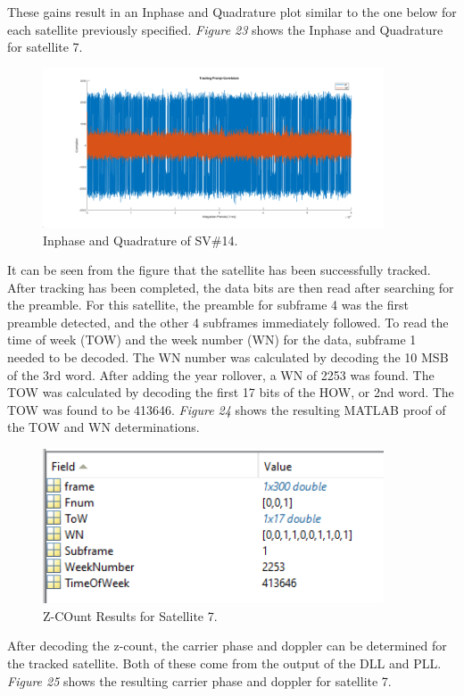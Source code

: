 \documentclass[11pt]{article}
\begin{document}
These gains result in an Inphase and Quadrature plot similar to the one below for each satellite 
previously specified. \emph{Figure 23} shows the Inphase and Quadrature for satellite 7.
    \begin{figure}[H]
        \centering
        \includegraphics[width=0.9\textwidth]{Lab_4_IQ.png}
        \caption{Inphase and Quadrature of SV\#14.}
    \end{figure}
It can be seen from the figure that the satellite has been successfully tracked. After tracking has been completed, the data bits are then read after searching for the preamble. For this satellite, the preamble for subframe 4 was the first preamble detected, and the other 4 subframes immediately followed. To read the time of week (TOW) and the week number (WN) for the data, subframe 1 needed to be decoded. The WN number was calculated by decoding the 10 MSB of the 3rd word. After adding the year rollover, a WN of 2253 was found. The TOW was calculated by decoding the first 17 bits of the HOW, or 2nd word. The TOW was found to be 413646. \emph{Figure 24} shows the resulting MATLAB proof of the TOW and WN determinations.
    \begin{figure}[H]
        \centering
        \includegraphics[width=0.9\textwidth]{Lab_4_Subframe1_SV7.png}
        \caption{Z-COunt Results for Satellite 7.}
    \end{figure}
After decoding the z-count, the carrier phase and doppler can be determined for the tracked satellite. Both of these come from the output of the DLL and PLL. \emph{Figure 25} shows the resulting carrier phase and doppler for satellite 7.
\end{document}
